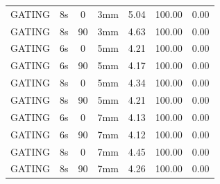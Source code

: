 \documentclass[type=dr, dr=rernat, accentcolor=tud7b,colorbacktitle, bigchapter, openright, twoside, 12pt ]{tudthesis}
\begin{document}
\begin{table}[H]
\begin{tabular}{|c||c|c|c||c|c|c|}
GATING & 8s & 0 & 3mm & 5.04 & 100.00 & 0.00 \\
GATING & 8s & 90 & 3mm & 4.63 & 100.00 & 0.00 \\
GATING & 6s & 0 & 5mm & 4.21 & 100.00 & 0.00 \\
GATING & 6s & 90 & 5mm & 4.17 & 100.00 & 0.00 \\
GATING & 8s & 0 & 5mm & 4.34 & 100.00 & 0.00 \\
GATING & 8s & 90 & 5mm & 4.21 & 100.00 & 0.00 \\
GATING & 6s & 0 & 7mm & 4.13 & 100.00 & 0.00 \\
GATING & 6s & 90 & 7mm & 4.12 & 100.00 & 0.00 \\
GATING & 8s & 0 & 7mm & 4.45 & 100.00 & 0.00 \\
GATING & 8s & 90 & 7mm & 4.26 & 100.00 & 0.00 \\
    \hline\hline 
  \end{tabular}
\end{table}

\newpage
\end{document}
